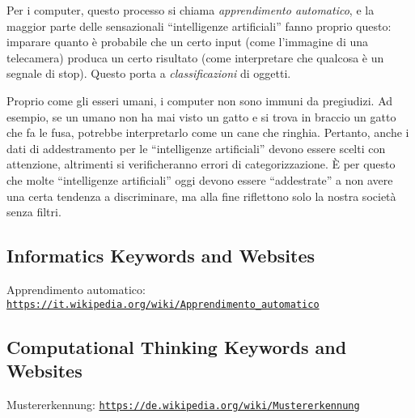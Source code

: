 \documentclass[a4paper,11pt]{report}
\newcommand{\BrochureUrlText}[1]{\texttt{#1}}
\begin{document}
Per i computer, questo processo si chiama \emph{apprendimento automatico}, e la maggior parte delle sensazionali \enquote{intelligenze artificiali} fanno proprio questo: imparare quanto è probabile che un certo input (come l’immagine di una telecamera) produca un certo risultato (come interpretare che qualcosa è un segnale di stop). Questo porta a \emph{classificazioni} di oggetti.

Proprio come gli esseri umani, i computer non sono immuni da pregiudizi. Ad esempio, se un umano non ha mai visto un gatto e si trova in braccio un gatto che fa le fusa, potrebbe interpretarlo come un cane che ringhia. Pertanto, anche i dati di addestramento per le \enquote{intelligenze artificiali} devono essere scelti con attenzione, altrimenti si verificheranno errori di categorizzazione. È per questo che molte \enquote{intelligenze artificiali} oggi devono essere \enquote{addestrate} a non avere una certa tendenza a discriminare, ma alla fine riflettono solo la nostra società senza filtri.


\subsection*{Informatics Keywords and Websites}

Apprendimento automatico: \href{https://it.wikipedia.org/wiki/Apprendimento_automatico}{\BrochureUrlText{https://it.wikipedia.org/wiki/Apprendimento\_automatico}}


\subsection*{Computational Thinking Keywords and Websites}

Mustererkennung: \href{https://de.wikipedia.org/wiki/Mustererkennung}{\BrochureUrlText{https://de.wikipedia.org/wiki/Mustererkennung}}
\end{document}
